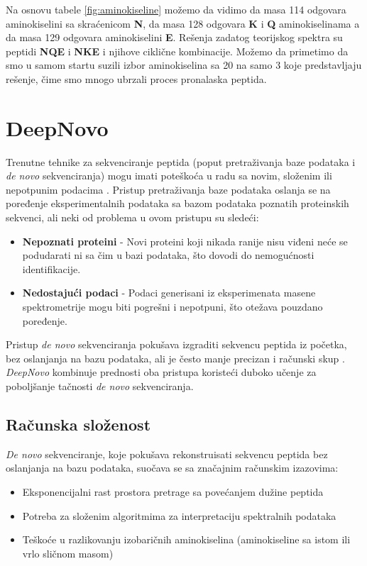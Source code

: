 \documentclass[12pt,oneside]{memoir}
\begin{document}
Na osnovu tabele \ref{fig:aminokiseline} možemo da vidimo da masa 114 odgovara aminokiselini sa skraćenicom \textbf{N}, da masa 128 odgovara \textbf{K} i \textbf{Q} aminokiselinama a da masa 129 odgovara aminokiselini \textbf{E}.
Rešenja zadatog teorijskog spektra su peptidi \textbf{NQE} i \textbf{NKE} i njihove ciklične kombinacije. Možemo da primetimo da smo u samom startu suzili izbor aminokiselina sa 20 na samo 3 koje predstavljaju rešenje, čime smo mnogo ubrzali proces pronalaska peptida.

\section{DeepNovo}

Trenutne tehnike za sekvenciranje peptida (poput pretraživanja baze podataka i \emph{de novo} sekvenciranja) mogu imati poteškoća u radu sa novim, složenim ili nepotpunim podacima \cite{deepnovo}. Pristup pretraživanja baze podataka oslanja se na poređenje eksperimentalnih podataka sa bazom podataka poznatih proteinskih sekvenci, ali neki od problema u ovom pristupu su sledeći:

\begin{itemize}
    \item \textbf{Nepoznati proteini} - Novi proteini koji nikada ranije nisu viđeni neće se podudarati ni sa čim u bazi podataka, što dovodi do nemogućnosti identifikacije.
    \item \textbf{Nedostajući podaci} - Podaci generisani iz eksperimenata masene spektrometrije mogu biti pogrešni i nepotpuni, što otežava pouzdano poređenje.
\end{itemize}

Pristup \emph{de novo} sekvenciranja pokušava izgraditi sekvencu peptida iz početka, bez oslanjanja na bazu podataka, ali je često manje precizan i računski skup \cite{deepnovo}. \emph{DeepNovo} kombinuje prednosti oba pristupa koristeći duboko učenje za poboljšanje tačnosti \emph{de novo} sekvenciranja.

\subsection{Računska složenost}
\emph{De novo} sekvenciranje, koje pokušava rekonstruisati sekvencu peptida bez oslanjanja na bazu podataka, suočava se sa značajnim računskim izazovima:

\begin{itemize}
\item Eksponencijalni rast prostora pretrage sa povećanjem dužine peptida
\item Potreba za složenim algoritmima za interpretaciju spektralnih podataka
\item Teškoće u razlikovanju izobaričnih aminokiselina (aminokiseline sa istom ili vrlo sličnom masom)
\end{itemize}
\end{document}
